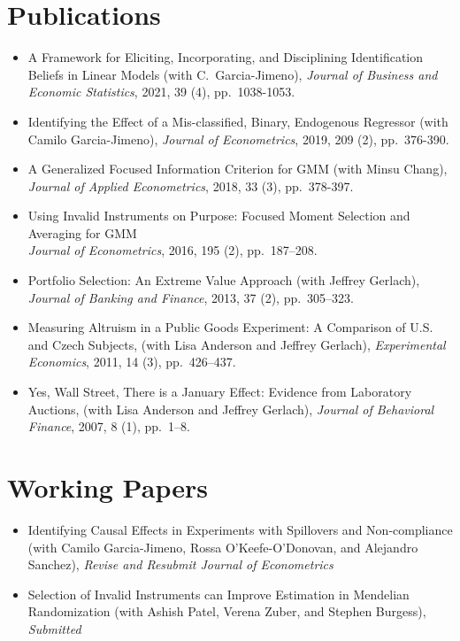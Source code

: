 \documentclass[line,overlapped]{myres}
\begin{document}
\begin{resume}
\section{\sc Publications}
\begin{itemize}
  \item A Framework for Eliciting, Incorporating, and Disciplining Identification Beliefs in Linear Models (with C.\ Garcia-Jimeno), \emph{Journal of Business and Economic Statistics}, 2021, 39 (4), pp.\ 1038-1053.
  \item Identifying the Effect of a Mis-classified, Binary, Endogenous Regressor (with Camilo Garcia-Jimeno), \emph{Journal of Econometrics}, 2019, 209 (2), pp.\ 376-390.
  \item A Generalized Focused Information Criterion for GMM (with Minsu Chang), \emph{Journal of Applied Econometrics}, 2018, 33 (3), pp.\ 378-397.
  \item Using Invalid Instruments on Purpose: Focused Moment Selection and Averaging for GMM\\ \emph{Journal of Econometrics}, 2016, 195 (2), pp.\ 187--208.
	\item Portfolio Selection: An Extreme Value Approach (with Jeffrey Gerlach), \emph{Journal of Banking and Finance}, 2013, 37 (2), pp.\ 305--323.
	\item Measuring Altruism in a Public Goods Experiment:  A Comparison of U.S. and Czech Subjects, (with Lisa Anderson and Jeffrey Gerlach), \emph{Experimental Economics}, 2011, 14 (3), pp.\ 426--437.
	\item Yes, Wall Street, There is a January Effect: Evidence from Laboratory Auctions, (with Lisa Anderson and Jeffrey Gerlach), \emph{Journal of Behavioral Finance}, 2007, 8 (1), pp.\ 1--8. 
\end{itemize}


\section{\sc Working Papers}
\begin{itemize}
  \item Identifying Causal Effects in Experiments with Spillovers and Non-compliance (with Camilo Garcia-Jimeno, Rossa O'Keefe-O'Donovan, and Alejandro Sanchez), \emph{Revise and Resubmit Journal of Econometrics}
  \item Selection of Invalid Instruments can Improve Estimation in Mendelian Randomization (with Ashish Patel, Verena Zuber, and Stephen Burgess), \emph{Submitted}
\end{itemize}



\end{resume}
\end{document}
